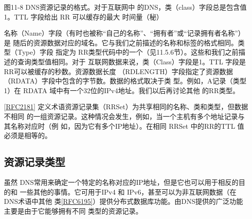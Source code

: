 图11-8 DNS资源记录的格式。对于互联网中
的DNS，类（class）字段总是包含值
1。TTL 字段给出 RR 可以缓存的最大
时间量（秘）

名称（Name）字段（有时也被称“自己的名称”、“拥有者”或“记录拥有者名称”）是
随后的资源数据对应的域名。它与我们之前描述的名称和标签的格式相同。类型（Type）字段
指定为 RR类型代码中的一个（见11.5.6节）。这些和我们之前描述的查询类型值相同。对于
互联网数据来说，类（Class）字段是1。TTL 字段是RR可以被缓存的秒数。资源数据长度
（RDLENGTH）字段指定了资源数据（RDATA）字段中包含的字节数。数据的格式取决于类
型。例如，A记录（类型1）在 RDATA 域中有一个32位的IPv4地址。我们以后再讨论其他
的RR类型。

\href{https://www.rfc-editor.org/rfc/rfc2181}{[RFC2181]} 定义术语资源记录集（RRSet）为共享相同的名称、类和类型，但数据不相同
的一组资源记录。这种情况会发生，例如，当一个主机有多个地址记录与其名称对应时（例
如，因为它有多个IP地址）。在相同 RRSet 中的RR的TTL 值必须是相等的。

\subsection{资源记录类型}

虽然 DNS常用来确定一个特定的名称对应的IP地址，但是它也可以用于相反的目的和
一些其他的事情。它可用于IPv4 和 IPv6，甚至可以为非互联网数据（在 DNS术语中其他
类\href{https://www.rfc-editor.org/rfc/rfc6195}{[RFC6195]}）提供分布式数据库功能。由DNS提供的广泛功能主要是由于它能够拥有不同
类型的资源记录。

